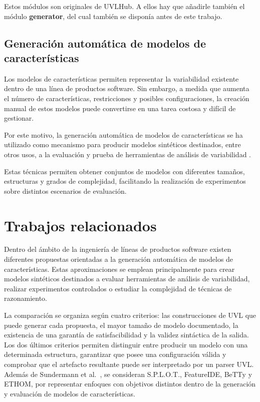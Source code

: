 Estos módulos son originales de UVLHub. A ellos hay que añadirle también el módulo \textbf{generator}, del cual también se disponía antes de este trabajo. 

\subsection{Generación automática de modelos de características}
\label{sec:concepto4}

Los modelos de características permiten representar la
variabilidad existente dentro de una línea de productos software. Sin embargo,
a medida que aumenta el número de características, restricciones y posibles
configuraciones, la creación manual de estos modelos puede convertirse en una
tarea costosa y difícil de gestionar.

Por este motivo, la generación automática de modelos de características se ha
utilizado como mecanismo para producir modelos sintéticos destinados, entre
otros usos, a la evaluación y prueba de herramientas de análisis de variabilidad
\cite{segura2011metamorphic,galindo2023llm}.

Estas técnicas permiten obtener conjuntos de modelos con diferentes tamaños,
estructuras y grados de complejidad, facilitando la realización de experimentos
sobre distintos escenarios de evaluación.

\section{Trabajos relacionados}
\label{sec:relacionados}



Dentro del ámbito de la ingeniería de líneas de productos software existen
diferentes propuestas orientadas a la generación automática de modelos de
características. Estas aproximaciones se emplean principalmente para crear
modelos sintéticos destinados a evaluar herramientas de análisis de
variabilidad, realizar experimentos controlados o estudiar la complejidad de
técnicas de razonamiento.

La comparación se organiza según cuatro criterios: las construcciones de UVL
que puede generar cada propuesta, el mayor tamaño de modelo documentado, la
existencia de una garantía de satisfacibilidad y la validez sintáctica de la
salida. Los dos últimos criterios permiten distinguir entre producir un modelo
con una determinada estructura, garantizar que posee una configuración válida y
comprobar que el artefacto resultante puede ser interpretado por un parser UVL.
Además de Sundermann et al.~\cite{sundermann2024generating}, se consideran
S.P.L.O.T., FeatureIDE, BeTTy y ETHOM, por representar enfoques con objetivos
distintos dentro de la generación y evaluación de modelos de características.

